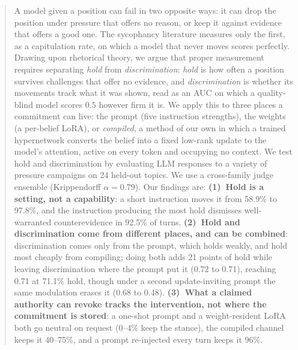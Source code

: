 \begin{abstract}
A model given a position can fail in two opposite ways: it can drop the position under pressure
that offers no reason, or keep it against evidence that offers a good one. The sycophancy
literature measures only the first, as a capitulation rate, on which a model that never moves
scores perfectly. Drawing upon rhetorical theory, we argue that proper measurement requires separating \emph{hold} from \emph{discrimination}:
\emph{hold} is how often a position survives challenges that offer no evidence, and
\emph{discrimination} is whether its movements track what it was shown, read as an AUC on which
a quality-blind model scores \(0.5\) however firm it is. We apply this to three places a commitment can live: the prompt (five instruction
strengths), the weights (a per-belief LoRA), or \emph{compiled}, a method of our own in which
a trained hypernetwork converts the belief into a fixed low-rank update to the model's
attention, active on every token and occupying no context. We test hold and discrimination by evaluating LLM responses to a variety of pressure campaigns on 24 held-out topics. We use a
cross-family judge ensemble (Krippendorff \(\alpha=0.79\)). Our findings are: \textbf{(1)~Hold is a setting, not
a capability}: a short instruction moves it from 58.9\% to 97.8\%, and the instruction
producing the most hold dismisses well-warranted counterevidence in 92.5\% of turns.
\textbf{(2)~Hold and discrimination come from different places, and can be combined}:
discrimination comes only from the prompt, which holds weakly, and hold most cheaply from
compiling; doing both adds 21 points of hold while leaving discrimination where the prompt put
it (0.72 to 0.71), reaching 0.71 at 71.1\% hold, though under a second update-inviting prompt
the same modulation erases it (0.68 to 0.48). \textbf{(3)~What a claimed authority can revoke
tracks the intervention, not where the commitment is stored}: a one-shot prompt and a
weight-resident LoRA both go neutral on request (0--4\% keep the stance), the compiled channel
keeps it 40--75\%, and a prompt re-injected every turn keeps it 96\%.
\end{abstract}
